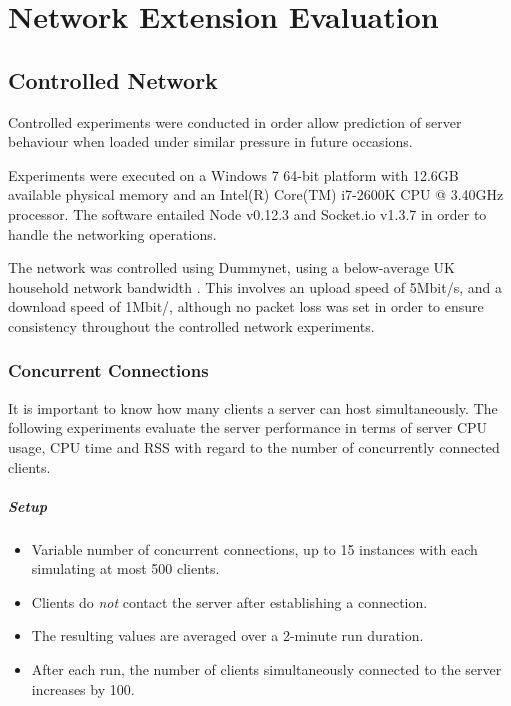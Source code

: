 \documentclass[bsc,frontabs,twoside,singlespacing,parskip,deptreport]{infthesis}     %
\begin{document}
\chapter{Network Extension Evaluation}

\section{Controlled Network}
Controlled experiments were conducted in order allow prediction of server behaviour when loaded under similar pressure in future occasions.

Experiments were executed on a Windows 7 64-bit platform with 12.6GB available physical memory and an Intel(R) Core(TM) i7-2600K CPU @ 3.40GHz processor. The software entailed Node v0.12.3 and Socket.io v1.3.7 in order to handle the networking operations.

The network was controlled using Dummynet, using a below-average UK household network bandwidth \cite{household_bandwidth}. This involves an upload speed of 5Mbit/s, and a download speed of 1Mbit/, although no packet loss was set in order to ensure consistency throughout the controlled network experiments.

\subsection{Concurrent Connections}
It is important to know how many clients a server can host simultaneously. The following experiments evaluate the server performance in terms of server CPU usage, CPU time and RSS with regard to the number of concurrently connected clients.

\paragraph*{Setup}
\begin{itemize}
\item Variable number of concurrent connections, up to 15 instances with each simulating at most 500 clients.
\item Clients do \emph{not} contact the server after establishing a connection.
\item The resulting values are averaged over a 2-minute run duration.
\item After each run, the number of clients simultaneously connected to the server increases by 100.
\end{itemize}
\end{document}
